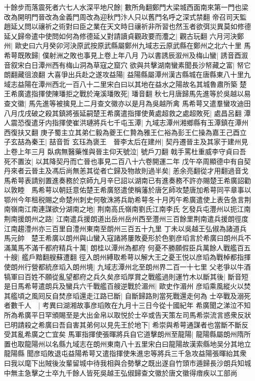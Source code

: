 十餘步而落震死者六七人水深平地尺餘|{
	數所角翻鄭門大梁城西面南來第一門也梁改為開明門晉改為金義門周改為迎秋門汴人只以舊門名呼之深式禁翻}
帝召司天監趙延乂問以禳祈之術對曰臣之業在天文時日禳祈非所習也然玉者欲弭災異莫如修德延乂歸帝遣中使問如何為修德延乂對請讀貞觀政要而灋之|{
	觀古玩翻}
六月河決鄭州|{
	歐史曰六月癸卯河決原武按原武縣屬鄭州九域志云原武縣在鄭州之北六十里}
馬希萼既敗歸|{
	僕射洲之敗也事見上卷上年八月}
乃以書誘辰溆州及梅山蠻|{
	誘音酉溆音叙宋白日潭州西有梅山洞為草寇之窟穴}
欲與共擊湖南蠻素聞長沙帑藏之富|{
	帑它朗翻藏徂浪翻}
大喜爭出兵赴之遂攻益陽|{
	益陽縣屬潭州漢古縣城在唐縣東八十里九域志益陽在潭州西北一百八十二里宋白曰以其地在益水之陽故名其城魯肅所築}
楚王希廣遣指揮使陳璠拒之戰於淹溪璠敗死|{
	璠音翻}
秋七月唐歸馬先進等於吳越以易查文徽|{
	馬先進等被擒見上二月查文徽亦以是月為吳越所禽}
馬希萼又遣羣蠻攻迪田八月戊戌破之殺其鎮將張延嗣楚王希廣遣指揮使黄處超救之處超敗死|{
	處昌呂翻}
潭人震恐復遣牙内指揮使崔洪璉將兵七千屯玉潭|{
	九域志潭州湘鄉縣有玉潭鎮在潭州西復扶又翻}
庚子蜀主立其弟仁毅為夔王仁贄為雅王仁裕為彭王仁操為嘉王己酉立子玄喆為秦王|{
	喆音哲}
玄珏為褒王　晉李太后在建州|{
	契丹遷晉主及其家于建州見上卷上年三月}
臥病無醫藥惟與晉主仰天號泣|{
	號戶刀翻}
戟手罵杜重威李守貞曰吾死不置汝|{
	以其降契丹而亡晉也事見二百八十六卷開運二年}
戊午卒周顯德中有自契丹來者云晉主及馮后尚無恙其從者亡歸及物故則過半矣|{
	恙余亮翻從才用翻過音戈}
馬希萼表請别置進奏務於京師九月辛巳詔以湖南已有進奏務不許亦賜楚王希廣詔勸以敦睦　馬希萼以朝廷意佑楚王希廣怒遣使稱藩於唐乞師攻楚唐加希萼同平章事以鄂州今年租税賜之命楚州刺史何敬洙將兵助希萼冬十月丙午希廣遣使上表告急言荆南嶺南江南連謀欲分湖南之地|{
	荆南高氏嶺南劉氏江南李氏}
乞發兵屯灃州以扼江南荆南援朗州之路|{
	江南遣兵援朗道出岳州岳州西至灃州三百餘里荆南遣兵援朗徑度江南趨澧州亦三百里自澧州東南至朗州三百五十九里}
丁未以吳越王弘俶為諸道兵馬元帥　楚王希廣以朗州與山蠻入寇諸將屢敗憂形於色劉彦瑫言於希廣曰朗州兵不滿萬馬不滿千都府精兵十萬|{
	朗桂以潭州為都府}
何憂不勝願假臣兵萬餘人戰艦百五十艘|{
	艦戶黯翻艘蘇遭翻}
徑入朗州縛取希萼以解大王之憂王悦以彦瑫為戰棹都指揮使朗州行營都統彦瑫入朗州境|{
	九域志潭州北至朗州界二百一十七里}
父老爭以牛酒犒軍曰百姓不願從亂望都府之兵久矣彦瑫厚賞之戰艦過則運竹木以斷其後|{
	斷音短}
是日馬希萼遣朗兵及蠻兵六千戰艦百艘逆戰於湄州|{
	歐史作湄州}
彦瑫乘風縱火以焚其艦頃之風囘反自焚彦瑫還走江路已斷|{
	自斷歸路則當死戰還走何為}
士卒戰及溺死者數千人　|{
	考異曰湖湘故事彦瑫敗在九月十三日今從十國紀年}
希廣聞之涕泣不知所為希廣平日罕頒賜至是大出金帛以取悦於士卒或告天策左司馬希崇流言惑衆反狀已明請殺之希廣曰吾自害其弟何以見先王於地下|{
	希崇與希萼通謀者也當斷不斷反受其亂希廣之亡宜矣}
馬軍指揮使張暉將兵自它道擊朗州至龍陽|{
	龍陽縣屬朗州隋所置也取龍陽州以名縣九域志在朗州東南八十五里宋白曰龍陽故漢索縣地吴分其地立龍陽縣}
聞彦瑫敗退屯益陽希萼又遣指揮使朱進忠等將兵三千急攻益陽張暉紿其衆曰我以麾下出賊後汝輩留城中待我相與合勢擊之既出遂自竹頭市遁歸長沙朗兵知城中無主急擊之士卒九千餘人皆死吳越王弘俶歸查文徽於唐文徽得瘖疾以工部尚


